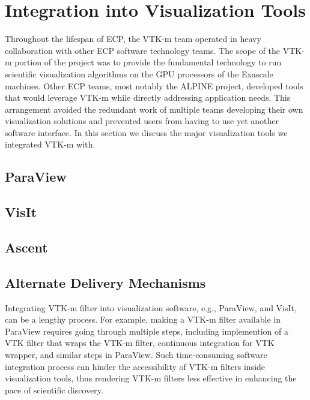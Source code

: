 \section{Integration into Visualization Tools}

Throughout the lifespan of ECP, the VTK-m team operated in heavy collaboration with other ECP software technology teams.
The scope of the VTK-m portion of the project was to provide the fundamental technology to run scientific visualization algorithms on the GPU processors of the Exascale machines.
Other ECP teams, most notably the ALPINE project, developed tools that would leverage VTK-m while directly addressing application needs.
This arrangement avoided the redundant work of multiple teams developing their own visualization solutions and prevented users from having to use yet another software interface.
In this section we discuss the major visualization tools we integrated VTK-m with.


\subsection{ParaView}


\subsection{VisIt}


\subsection{Ascent}


\subsection{Alternate Delivery Mechanisms}

Integrating VTK-m filter into visualization software, e.g., ParaView, and VisIt, can be a lengthy process. For example, making a VTK-m filter available in ParaView requires going through multiple steps, including implemention of a VTK filter that wraps the VTK-m filter, continuous integration for VTK wrapper, and similar steps in ParaView. Such time-consuming software integration process can hinder the accessibility of VTK-m filters inside visualization tools, thus rendering VTK-m filters less effective in enhancing the pace of scientific discovery. 

